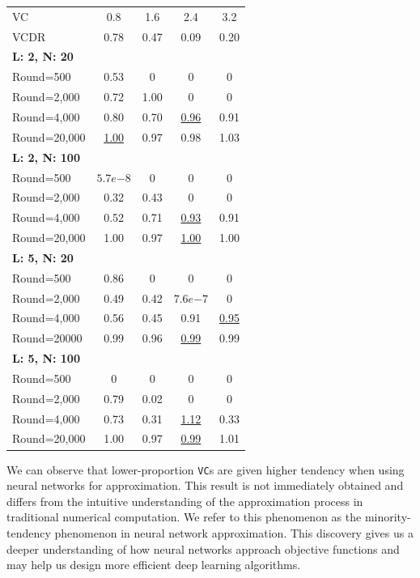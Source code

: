 \documentclass[final]{siamart220329}
\newtheorem{theoretical insights}{Theoretical insights}
\newtheorem{practical takeaway}{Practical takeaway}
\begin{document}
{{{\begin{footnotesize}
\begin{table}[htbp]
\begin{minipage}[t]{0.52\textwidth}
\begin{tabular}{@{}lcccc@{}} 
\toprule
VC & 0.8 & 1.6 & 2.4 & 3.2  \\
VCDR & 0.78 & 0.47 & 0.09 & 0.20 \\
\midrule
\textbf{L: 2, N: 20} &&&&\\
Round=500   & 0.53 & 0 & 0 & 0 \\
Round=2,000  & 0.72 & 1.00 & 0 & 0 \\
Round=4,000  & 0.80 & 0.70 & \underline{0.96} & 0.91 \\
Round=20,000 & \underline{1.00} & 0.97 & 0.98 & 1.03 \\
\midrule
\textbf{L: 2, N: 100} &&&&\\
Round=500   & $5.7e{-8}$ & 0 & 0 & 0 \\
Round=2,000  & 0.32 & 0.43 & 0 & 0 \\
Round=4,000  & 0.52 & 0.71 & \underline{0.93} & 0.91 \\
Round=20,000 & 1.00 & 0.97 & \underline{1.00} & 1.00 \\
\midrule
\textbf{L: 5, N: 20} &&&&\\
Round=500   & 0.86 & 0 & 0 & 0 \\
Round=2,000  & 0.49 & 0.42 & $7.6e{-7}$ & 0 \\
Round=4,000  & 0.56 & 0.45 & 0.91 & \underline{0.95} \\
Round=20000 & 0.99 & 0.96 & \underline{0.99} & 0.99 \\
\midrule
\textbf{L: 5, N: 100} &&&&\\
Round=500   & 0 & 0 & 0 & 0 \\
Round=2,000  & 0.79 & 0.02 & 0 & 0 \\
Round=4,000  & 0.73 & 0.31 & \underline{1.12} & 0.33 \\
Round=20,000 & 1.00 & 0.97 & \underline{0.99} & 1.01 \\
\bottomrule
\end{tabular}
\end{minipage}
\end{table}
\end{footnotesize}



We can observe that lower-proportion \texttt{VC}s are given higher tendency when using neural networks for approximation. This result is not immediately {obtained} and differs from the intuitive understanding of the approximation process in traditional numerical computation. We refer to this phenomenon as the minority-tendency phenomenon in neural network approximation. {This discovery gives us a deeper understanding of how neural networks approach objective functions and may help us design more efficient deep learning algorithms.}





}}}
\end{document}
